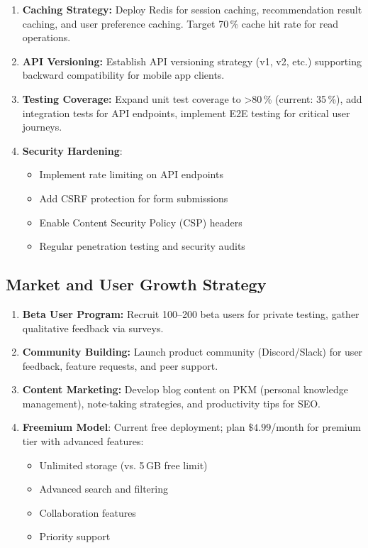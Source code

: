 \documentclass[10pt,twocolumn,a4paper]{article}
\begin{document}
\begin{table}[h]
\begin{enumerate}
\item \textbf{Caching Strategy:} Deploy Redis for session caching, recommendation result
  caching, and user preference caching. Target 70\,\% cache hit rate for read operations.

\item \textbf{API Versioning:} Establish API versioning strategy (v1, v2, etc.) supporting
  backward compatibility for mobile app clients.

\item \textbf{Testing Coverage:} Expand unit test coverage to >80\,\% (current: 35\,\%), add
  integration tests for API endpoints, implement E2E testing for critical user journeys.

\item \textbf{Security Hardening}:
  \begin{itemize}
    \item Implement rate limiting on API endpoints
    \item Add CSRF protection for form submissions
    \item Enable Content Security Policy (CSP) headers
    \item Regular penetration testing and security audits
  \end{itemize}

\end{enumerate}

\subsection{Market and User Growth Strategy}

\begin{enumerate}

\item \textbf{Beta User Program:} Recruit 100--200 beta users for private testing, gather
  qualitative feedback via surveys.

\item \textbf{Community Building:} Launch product community (Discord/Slack) for user feedback,
  feature requests, and peer support.

\item \textbf{Content Marketing:} Develop blog content on PKM (personal knowledge management),
  note-taking strategies, and productivity tips for SEO.

\item \textbf{Freemium Model}: Current free deployment; plan $\$4.99$/month for premium tier
  with advanced features:
  \begin{itemize}
    \item Unlimited storage (vs. 5\,GB free limit)
    \item Advanced search and filtering
    \item Collaboration features
    \item Priority support
  \end{itemize}


\end{enumerate}
\end{table}
\end{document}

